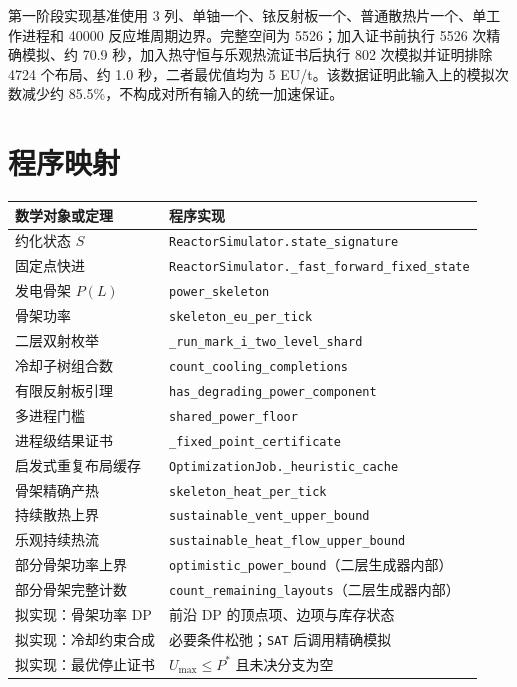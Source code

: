 \documentclass[UTF8,11pt]{ctexart}
\begin{document}
第一阶段实现基准使用 3 列、单铀一个、铱反射板一个、普通散热片一个、单工作进程和 40000 反应堆周期边界。完整空间为 5526；加入证书前执行 5526 次精确模拟、约 70.9 秒，加入热守恒与乐观热流证书后执行 802 次模拟并证明排除 4724 个布局、约 1.0 秒，二者最优值均为 5 EU/t。该数据证明此输入上的模拟次数减少约 85.5\%，不构成对所有输入的统一加速保证。

\section{程序映射}

\begin{longtable}{p{}p{}}
\toprule
数学对象或定理 & 程序实现 \\
\midrule
约化状态 $S$ & \texttt{ReactorSimulator.state\_signature} \\
固定点快进 & \texttt{ReactorSimulator.\_fast\_forward\_fixed\_state} \\
发电骨架 $P(L)$ & \texttt{power\_skeleton} \\
骨架功率 & \texttt{skeleton\_eu\_per\_tick} \\
二层双射枚举 & \texttt{\_run\_mark\_i\_two\_level\_shard} \\
冷却子树组合数 & \texttt{count\_cooling\_completions} \\
有限反射板引理 & \texttt{has\_degrading\_power\_component} \\
多进程门槛 & \texttt{shared\_power\_floor} \\
进程级结果证书 & \texttt{\_fixed\_point\_certificate} \\
启发式重复布局缓存 & \texttt{OptimizationJob.\_heuristic\_cache} \\
骨架精确产热 & \texttt{skeleton\_heat\_per\_tick} \\
持续散热上界 & \texttt{sustainable\_vent\_upper\_bound} \\
乐观持续热流 & \texttt{sustainable\_heat\_flow\_upper\_bound} \\
部分骨架功率上界 & \texttt{optimistic\_power\_bound}（二层生成器内部） \\
部分骨架完整计数 & \texttt{count\_remaining\_layouts}（二层生成器内部） \\
拟实现：骨架功率 DP & 前沿 DP 的顶点项、边项与库存状态 \\
拟实现：冷却约束合成 & 必要条件松弛；\texttt{SAT} 后调用精确模拟 \\
拟实现：最优停止证书 & $U_{\max}\le P^*$ 且未决分支为空 \\
\bottomrule
\end{longtable}
\end{document}
